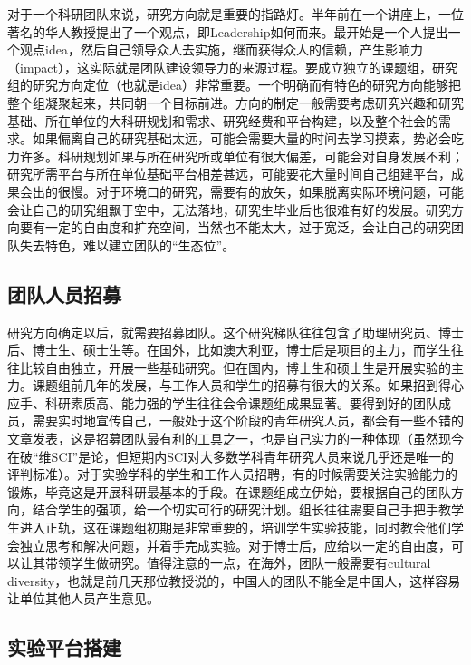 \documentclass[
]{book}
\begin{document}
对于一个科研团队来说，研究方向就是重要的指路灯。半年前在一个讲座上，一位著名的华人教授提出了一个观点，即Leadership如何而来。最开始是一个人提出一个观点idea，然后自己领导众人去实施，继而获得众人的信赖，产生影响力（impact），这实际就是团队建设领导力的来源过程。要成立独立的课题组，研究组的研究方向定位（也就是idea）非常重要。一个明确而有特色的研究方向能够把整个组凝聚起来，共同朝一个目标前进。方向的制定一般需要考虑研究兴趣和研究基础、所在单位的大科研规划和需求、研究经费和平台构建，以及整个社会的需求。如果偏离自己的研究基础太远，可能会需要大量的时间去学习摸索，势必会吃力许多。科研规划如果与所在研究所或单位有很大偏差，可能会对自身发展不利；研究所需平台与所在单位基础平台相差甚远，可能要花大量时间自己组建平台，成果会出的很慢。对于环境口的研究，需要有的放矢，如果脱离实际环境问题，可能会让自己的研究组飘于空中，无法落地，研究生毕业后也很难有好的发展。研究方向要有一定的自由度和扩充空间，当然也不能太大，过于宽泛，会让自己的研究团队失去特色，难以建立团队的``生态位''。

\hypertarget{ux56e2ux961fux4ebaux5458ux62dbux52df}{%
\subsection{团队人员招募}\label{ux56e2ux961fux4ebaux5458ux62dbux52df}}

研究方向确定以后，就需要招募团队。这个研究梯队往往包含了助理研究员、博士后、博士生、硕士生等。在国外，比如澳大利亚，博士后是项目的主力，而学生往往比较自由独立，开展一些基础研究。但在国内，博士生和硕士生是开展实验的主力。课题组前几年的发展，与工作人员和学生的招募有很大的关系。如果招到得心应手、科研素质高、能力强的学生往往会令课题组成果显著。要得到好的团队成员，需要实时地宣传自己，一般处于这个阶段的青年研究人员，都会有一些不错的文章发表，这是招募团队最有利的工具之一，也是自己实力的一种体现（虽然现今在破``维SCI''是论，但短期内SCI对大多数学科青年研究人员来说几乎还是唯一的评判标准）。对于实验学科的学生和工作人员招聘，有的时候需要关注实验能力的锻炼，毕竟这是开展科研最基本的手段。在课题组成立伊始，要根据自己的团队方向，结合学生的强项，给一个切实可行的研究计划。组长往往需要自己手把手教学生进入正轨，这在课题组初期是非常重要的，培训学生实验技能，同时教会他们学会独立思考和解决问题，并着手完成实验。对于博士后，应给以一定的自由度，可以让其带领学生做研究。值得注意的一点，在海外，团队一般需要有cultural diversity，也就是前几天那位教授说的，中国人的团队不能全是中国人，这样容易让单位其他人员产生意见。

\hypertarget{ux5b9eux9a8cux5e73ux53f0ux642dux5efa}{%
\subsection{实验平台搭建}\label{ux5b9eux9a8cux5e73ux53f0ux642dux5efa}}
\end{document}
